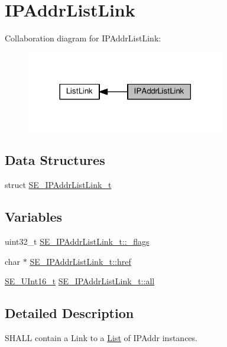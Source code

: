 \hypertarget{group__IPAddrListLink}{}\section{I\+P\+Addr\+List\+Link}
\label{group__IPAddrListLink}
Collaboration diagram for I\+P\+Addr\+List\+Link\+:\nopagebreak
\begin{figure}[H]
\begin{center}
\leavevmode
\includegraphics[width=246pt]{group__IPAddrListLink}
\end{center}
\end{figure}
\subsection*{Data Structures}
\begin{DoxyCompactItemize}
\item 
struct \hyperlink{structSE__IPAddrListLink__t}{S\+E\+\_\+\+I\+P\+Addr\+List\+Link\+\_\+t}
\end{DoxyCompactItemize}
\subsection*{Variables}
\begin{DoxyCompactItemize}
\item 
uint32\+\_\+t \hyperlink{group__IPAddrListLink_ga0fc4d06150ae2ccf7a69b0f01763262b}{S\+E\+\_\+\+I\+P\+Addr\+List\+Link\+\_\+t\+::\+\_\+flags}
\item 
char $\ast$ \hyperlink{group__IPAddrListLink_gae02555e807312646921ccc931a552eef}{S\+E\+\_\+\+I\+P\+Addr\+List\+Link\+\_\+t\+::href}
\item 
\hyperlink{group__UInt16_gac68d541f189538bfd30cfaa712d20d29}{S\+E\+\_\+\+U\+Int16\+\_\+t} \hyperlink{group__IPAddrListLink_gabfb9db992e8d73c518bf1220efa6bbae}{S\+E\+\_\+\+I\+P\+Addr\+List\+Link\+\_\+t\+::all}
\end{DoxyCompactItemize}


\subsection{Detailed Description}
S\+H\+A\+LL contain a Link to a \hyperlink{structList}{List} of I\+P\+Addr instances. 

